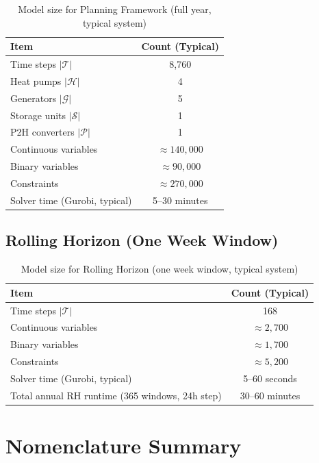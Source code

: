 \documentclass[11pt]{article}
\begin{document}
\begin{table}[h]
\centering
\begin{tabular}{lc}
\toprule
\textbf{Item} & \textbf{Count (Typical)} \\
\midrule
Time steps $|\mathcal{T}|$ & 8,760 \\
Heat pumps $|\mathcal{H}|$ & 4 \\
Generators $|\mathcal{G}|$ & 5 \\
Storage units $|\mathcal{S}|$ & 1 \\
P2H converters $|\mathcal{P}|$ & 1 \\
\midrule
Continuous variables & $\approx 140{,}000$ \\
Binary variables & $\approx 90{,}000$ \\
Constraints & $\approx 270{,}000$ \\
\midrule
Solver time (Gurobi, typical) & 5--30 minutes \\
\bottomrule
\end{tabular}
\caption{Model size for Planning Framework (full year, typical system)}
\label{tab:model_size_pf}
\end{table}

\subsection{Rolling Horizon (One Week Window)}

\begin{table}[h]
\centering
\begin{tabular}{lc}
\toprule
\textbf{Item} & \textbf{Count (Typical)} \\
\midrule
Time steps $|\mathcal{T}|$ & 168 \\
Continuous variables & $\approx 2{,}700$ \\
Binary variables & $\approx 1{,}700$ \\
Constraints & $\approx 5{,}200$ \\
\midrule
Solver time (Gurobi, typical) & 5--60 seconds \\
Total annual RH runtime (365 windows, 24h step) & 30--60 minutes \\
\bottomrule
\end{tabular}
\caption{Model size for Rolling Horizon (one week window, typical system)}
\label{tab:model_size_rh}
\end{table}

\section{Nomenclature Summary}
\end{document}
